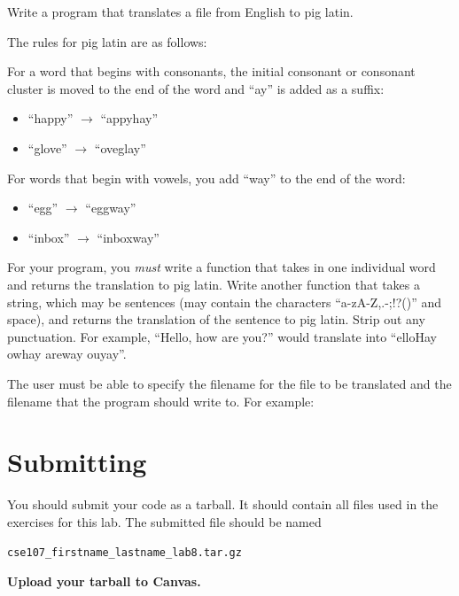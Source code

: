 \documentclass[11pt]{cselabheader}
\begin{document}
\begin{ex}[piglatin.py] Write a program that translates a file from English to
  pig latin.

  The rules for pig latin are as follows:

  For a word that begins with consonants, the initial consonant or
  consonant cluster is moved to the end of the word and ``ay'' is added as a
  suffix:
  \begin{multicols}{2}
  \begin{itemize}
    \item ``happy'' $\to$ ``appyhay''
    \item ``glove'' $\to$ ``oveglay''
  \end{itemize}
  \end{multicols}

  For words that begin with vowels, you add ``way'' to the end of the word:
  \begin{multicols}{2}
  \begin{itemize}
    \item ``egg'' $\to$ ``eggway''
    \item ``inbox'' $\to$ ``inboxway''
  \end{itemize}
  \end{multicols}

  For your program, you \emph{must} write a function that takes in one
  individual word and returns the translation to pig latin. Write another
  function that takes a string, which may be sentences (may contain the
  characters ``a-zA-Z,.-;!?()'' and space), and returns the translation of the
  sentence to pig latin. Strip out any punctuation. For example, ``Hello, how
  are you?'' would translate into ``elloHay owhay areway ouyay''.

  The user must be able to specify the filename for the file to be translated
  and the filename that the program should write to. For example:

\end{ex}

\pagebreak
\section{Submitting}
You should submit your code as a tarball. It should contain all files
used in the exercises for this lab. The submitted file should be named
\begin{center}
  \texttt{cse107\_firstname\_lastname\_lab8.tar.gz}
\end{center}

\begin{center}
  \textbf{Upload your tarball to Canvas.}
\end{center}

\listoftheorems
\end{document}
